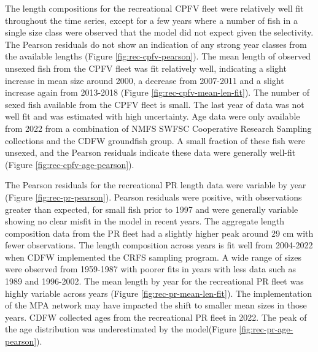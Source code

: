 \documentclass[11pt,
  english,
  letterpaper,
]{article}
\begin{document}
The length compositions for the recreational CPFV fleet were relatively well fit throughout the time series, except for a few years where a number of fish in a single size class were observed that the model did not expect given the selectivity. The Pearson residuals do not show an indication of any strong year classes from the available lengths (Figure \ref{fig:rec-cpfv-pearson}). The mean length of observed unsexed fish from the CPFV fleet was fit relatively well, indicating a slight increase in mean size around 2000, a decrease from 2007-2011 and a slight increase again from 2013-2018 (Figure \ref{fig:rec-cpfv-mean-len-fit}). The number of sexed fish available from the CPFV fleet is small. The last year of data was not well fit and was estimated with high uncertainty. Age data were only available from 2022 from a combination of NMFS SWFSC Cooperative Research Sampling collections and the CDFW groundfish group. A small fraction of these fish were unsexed, and the Pearson residuals indicate these data were generally well-fit (Figure \ref{fig:rec-cpfv-age-pearson}).

The Pearson residuals for the recreational PR length data were variable by year (Figure \ref{fig:rec-pr-pearson}). Pearson residuals were positive, with observations greater than expected, for small fish prior to 1997 and were generally variable showing no clear misfit in the model in recent years. The aggregate length composition data from the PR fleet had a slightly higher peak around 29 cm with fewer observations. The length composition across years is fit well from 2004-2022 when CDFW implemented the CRFS sampling program. A wide range of sizes were observed from 1959-1987 with poorer fits in years with less data such as 1989 and 1996-2002. The mean length by year for the recreational PR fleet was highly variable across years (Figure \ref{fig:rec-pr-mean-len-fit}). The implementation of the MPA network may have impacted the shift to smaller mean sizes in those years. CDFW collected ages from the recreational PR fleet in 2022. The peak of the age distribution was underestimated by the model(Figure \ref{fig:rec-pr-age-pearson}).
\end{document}

